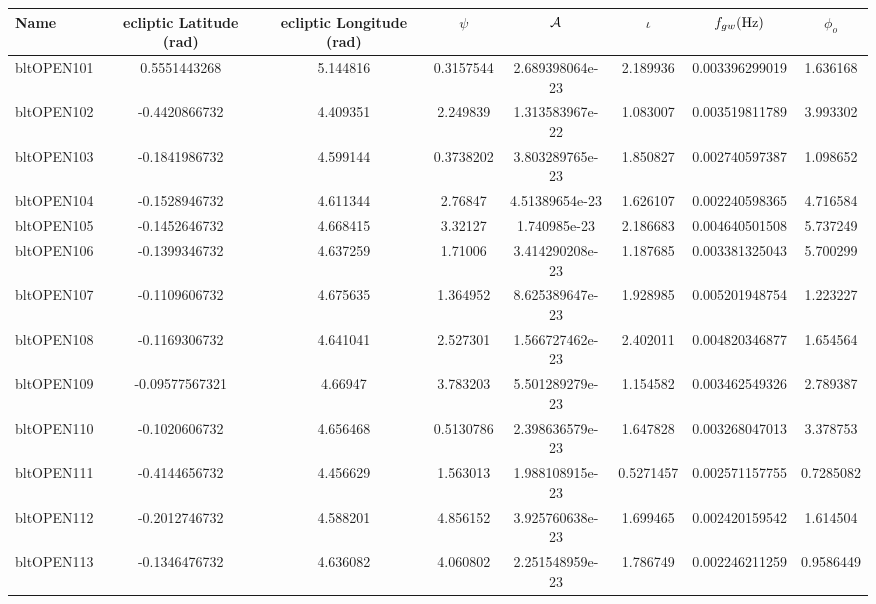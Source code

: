 \documentclass[11pt]{report}
\begin{document}
\begin{sidewaystable}
\centering
\small{
\begin{tabular}{|l|c|c|c|c|c|c|c|}
\hline \textbf{Name} & {\bf ecliptic Latitude (rad)} & {\bf ecliptic
Longitude (rad)} & $\psi$ & $\cal A$ &$\iota$ & $f_{gw} ({\rm Hz})$ &
$\phi_{o}$ \\
\hline 
bltOPEN101   & 0.5551443268   &     5.144816   &    0.3157544   & 2.689398064e-23   &     2.189936   & 0.003396299019   &     1.636168\\
bltOPEN102   & -0.4420866732   &     4.409351   &     2.249839   & 1.313583967e-22   &     1.083007   & 0.003519811789   &     3.993302\\
bltOPEN103   & -0.1841986732   &     4.599144   &    0.3738202   & 3.803289765e-23   &     1.850827   & 0.002740597387   &     1.098652\\
bltOPEN104   & -0.1528946732   &     4.611344   &      2.76847   & 4.51389654e-23   &     1.626107   & 0.002240598365   &     4.716584\\
bltOPEN105   & -0.1452646732   &     4.668415   &      3.32127   & 1.740985e-23   &     2.186683   & 0.004640501508   &     5.737249\\
bltOPEN106   & -0.1399346732   &     4.637259   &      1.71006   & 3.414290208e-23   &     1.187685   & 0.003381325043   &     5.700299\\
bltOPEN107   & -0.1109606732   &     4.675635   &     1.364952   & 8.625389647e-23   &     1.928985   & 0.005201948754   &     1.223227\\
bltOPEN108   & -0.1169306732   &     4.641041   &     2.527301   & 1.566727462e-23   &     2.402011   & 0.004820346877   &     1.654564\\
bltOPEN109   & -0.09577567321   &      4.66947   &     3.783203   & 5.501289279e-23   &     1.154582   & 0.003462549326   &     2.789387\\
bltOPEN110   & -0.1020606732   &     4.656468   &    0.5130786   & 2.398636579e-23   &     1.647828   & 0.003268047013   &     3.378753\\
bltOPEN111   & -0.4144656732   &     4.456629   &     1.563013   & 1.988108915e-23   &    0.5271457   & 0.002571157755   &    0.7285082\\
bltOPEN112   & -0.2012746732   &     4.588201   &     4.856152   & 3.925760638e-23   &     1.699465   & 0.002420159542   &     1.614504\\
bltOPEN113   & -0.1346476732   &     4.636082   &     4.060802   & 2.251548959e-23   &     1.786749   & 0.002246211259   &    0.9586449\\

\end{tabular}}
\end{sidewaystable}
\end{document}
